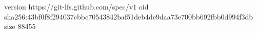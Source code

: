 version https://git-lfs.github.com/spec/v1
oid sha256:43bf0f8f294037cbbc70543842baf51deb4de9daa73e700bb692fbb0d994f3db
size 88455
